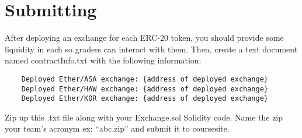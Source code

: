 \documentclass[10pt]{article}
\begin{document}
\section{Submitting}
After deploying an exchange for each ERC-20 token, you should provide some liquidity in each so graders can interact with them.
Then, create a text document named contractInfo.txt with the following information:

\begin{verbatim}
    Deployed Ether/ASA exchange: {address of deployed exchange}
    Deployed Ether/HAW exchange: {address of deployed exchange}
    Deployed Ether/KOR exchange: {address of deployed exchange}
\end{verbatim}
Zip up this .txt file along with your Exchange.sol Solidity code.  Name the zip your team’s acronym ex: “abc.zip” and submit it to coursesite.
\end{document}
